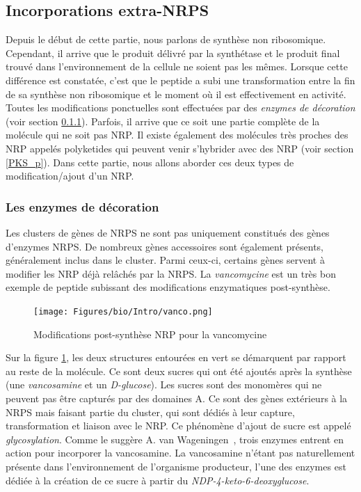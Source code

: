 \subsection{Incorporations extra-NRPS}

Depuis le début de cette partie, nous parlons de synthèse non ribosomique.
Cependant, il arrive que le produit délivré par la synthétase et le produit final trouvé dans l'environnement de la cellule ne soient pas les mêmes.
Lorsque cette différence est constatée, c'est que le peptide a subi une transformation entre la fin de sa synthèse non ribosomique et le moment où il est effectivement en activité.
Toutes les modifications ponctuelles sont effectuées par des \textit{enzymes de décoration} (voir section \ref{sucres}).
Parfois, il arrive que ce soit une partie complète de la molécule qui ne soit pas NRP.
Il existe également des molécules très proches des NRP appelés polyketides qui peuvent venir s'hybrider avec des NRP (voir section \ref{PKS_p}).
Dans cette partie, nous allons aborder ces deux types de modification/ajout d'un NRP.


\subsubsection{Les enzymes de décoration}

\label{sucres}

Les clusters de gènes de NRPS ne sont pas uniquement constitués des gènes d'enzymes NRPS.
De nombreux gènes accessoires sont également présents, généralement inclus dans le cluster.
Parmi ceux-ci, certains gènes servent à modifier les NRP déjà relâchés par la NRPS.
La \textit{vancomycine} est un très bon exemple de peptide subissant des modifications enzymatiques post-synthèse.

\begin{figure}[h!]
  \begin{center}
    \texttt{[image: Figures/bio/Intro/vanco.png]}
    \caption{\label{vanco}Modifications post-synthèse NRP pour la vancomycine}
  \end{center}
\end{figure}

Sur la figure \ref{vanco}, les deux structures entourées en vert se démarquent par rapport au reste de la molécule.
Ce sont deux sucres qui ont été ajoutés après la synthèse (une \textit{vancosamine} et un \textit{D-glucose}).
Les sucres sont des monomères qui ne peuvent pas être capturés par des domaines A.
Ce sont des gènes extérieurs à la NRPS mais faisant partie du cluster, qui sont dédiés à leur capture, transformation et liaison avec le NRP.
Ce phénomène d'ajout de sucre est appelé \textit{glycosylation}.
Comme le suggère A. van Wageningen~\cite{van_wageningen_sequencing_1998}, trois enzymes entrent en action pour incorporer la vancosamine.
La vancosamine n'étant pas naturellement présente dans l'environnement de l'organisme producteur, l'une des enzymes est dédiée à la création de ce sucre à partir du \textit{NDP-4-keto-6-deoxyglucose}.

